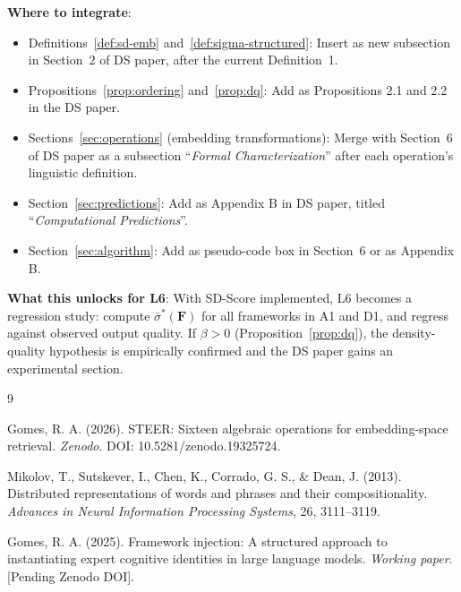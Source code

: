 \documentclass[11pt,a4paper]{article}
\begin{document}
\textbf{Where to integrate}:
\begin{itemize}
  \item Definitions~\ref{def:sd-emb} and~\ref{def:sigma-structured}: Insert as
    new subsection in Section~2 of DS paper, after the current Definition~1.
  \item Propositions~\ref{prop:ordering} and~\ref{prop:dq}: Add as
    Propositions 2.1 and 2.2 in the DS paper.
  \item Sections~\ref{sec:operations} (embedding transformations): Merge with
    Section~6 of DS paper as a subsection ``\textit{Formal Characterization}''
    after each operation's linguistic definition.
  \item Section~\ref{sec:predictions}: Add as Appendix B in DS paper,
    titled ``\textit{Computational Predictions}''.
  \item Section~\ref{sec:algorithm}: Add as pseudo-code box in Section~6
    or as Appendix B.
\end{itemize}

\textbf{What this unlocks for L6}:
With SD-Score implemented, L6 becomes a regression study:
compute $\bar{\sigma}^*(\mathbf{F})$ for all frameworks in A1 and D1,
and regress against observed output quality.
If $\beta > 0$ (Proposition~\ref{prop:dq}), the density-quality hypothesis
is empirically confirmed and the DS paper gains an experimental section.

\begin{thebibliography}{9}

Gomes, R. A. (2026).
STEER: Sixteen algebraic operations for embedding-space retrieval.
\textit{Zenodo}. DOI: 10.5281/zenodo.19325724.

Mikolov, T., Sutskever, I., Chen, K., Corrado, G. S., \& Dean, J. (2013).
Distributed representations of words and phrases and their compositionality.
\textit{Advances in Neural Information Processing Systems}, 26, 3111--3119.

Gomes, R. A. (2025).
Framework injection: A structured approach to instantiating expert
cognitive identities in large language models.
\textit{Working paper}. [Pending Zenodo DOI].

\end{thebibliography}
\end{document}
